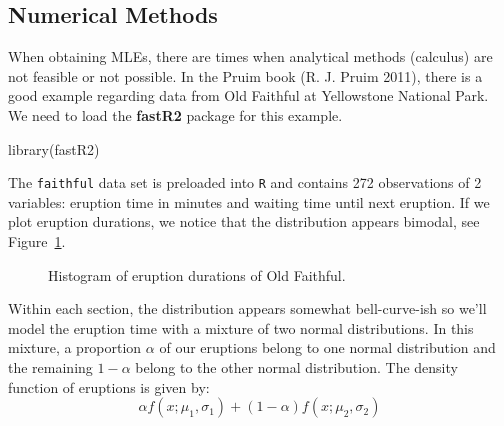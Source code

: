 \documentclass[
  letterpaper,
  DIV=11,
  numbers=noendperiod]{scrreprt}
\newenvironment{Shaded}{\begin{snugshade}}{\end{snugshade}}
\newcommand{\FunctionTok}[1]{\textcolor[rgb]{0.28,0.35,0.67}{#1}}
\newcommand{\NormalTok}[1]{\textcolor[rgb]{0.00,0.23,0.31}{#1}}
\begin{document}
\subsection{Numerical Methods}\label{numerical-methods}

When obtaining MLEs, there are times when analytical methods (calculus)
are not feasible or not possible. In the Pruim book (R. J. Pruim 2011),
there is a good example regarding data from Old Faithful at Yellowstone
National Park. We need to load the \textbf{fastR2} package for this
example.

\begin{Shaded}
\begin{Highlighting}[]
\FunctionTok{library}\NormalTok{(fastR2)}
\end{Highlighting}
\end{Shaded}

The \texttt{faithful} data set is preloaded into \texttt{R} and contains
272 observations of 2 variables: eruption time in minutes and waiting
time until next eruption. If we plot eruption durations, we notice that
the distribution appears bimodal, see Figure~\ref{fig-hist171}.

\begin{figure}


\caption{\label{fig-hist171}Histogram of eruption durations of Old
Faithful.}

\end{figure}%

Within each section, the distribution appears somewhat bell-curve-ish so
we'll model the eruption time with a mixture of two normal
distributions. In this mixture, a proportion \(\alpha\) of our eruptions
belong to one normal distribution and the remaining \(1-\alpha\) belong
to the other normal distribution. The density function of eruptions is
given by: \[
\alpha f(x;\mu_1,\sigma_1)+(1-\alpha)f(x;\mu_2,\sigma_2)
\]
\end{document}
